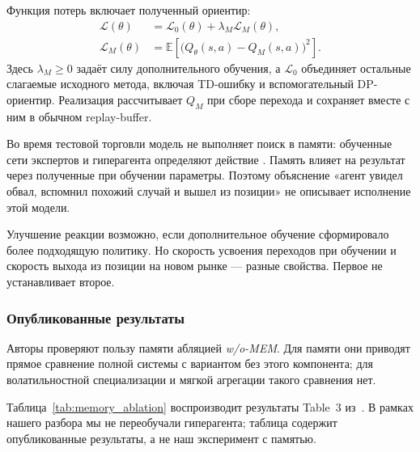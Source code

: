 \documentclass[9pt,a4paper,twocolumn]{extarticle}
\begin{document}
Функция потерь включает полученный ориентир:
\begin{equation}
  \begin{aligned}
    \mathcal L(\theta)
    &=
    \mathcal L_0(\theta)
    +\lambda_M\mathcal L_M(\theta),\\
    \mathcal L_M(\theta)
    &=
    \mathbb E\left[
      \bigl(Q_\theta(s,a)-Q_M(s,a)\bigr)^2
    \right].
  \end{aligned}
  \label{eq:memory_loss}
\end{equation}
Здесь $\lambda_M\geq0$ задаёт силу дополнительного обучения, а $\mathcal L_0$ объединяет
остальные слагаемые исходного метода, включая TD-ошибку и вспомогательный DP-ориентир.
Реализация рассчитывает $Q_M$ при сборе перехода и сохраняет вместе с ним в обычном
replay-buffer.

Во время тестовой торговли модель не выполняет поиск в памяти: обученные сети экспертов и
гиперагента определяют действие \cite{macrohftcode}. Память влияет на результат через полученные
при обучении параметры. Поэтому объяснение «агент увидел обвал, вспомнил похожий случай и вышел
из позиции» не описывает исполнение этой модели.

Улучшение реакции возможно, если дополнительное обучение сформировало более подходящую политику.
Но скорость усвоения переходов при обучении и скорость выхода из позиции
на новом рынке --- разные свойства. Первое не устанавливает второе.

\subsubsection{Опубликованные результаты}

Авторы проверяют пользу памяти абляцией \emph{w/o-MEM}. Для памяти они приводят прямое сравнение
полной системы с вариантом без этого компонента; для волатильностной специализации и мягкой
агрегации такого сравнения нет.

Таблица~\ref{tab:memory_ablation} воспроизводит результаты Table~3 из~\cite{zong2024macrohft}. В
рамках нашего разбора мы не переобучали гиперагента; таблица содержит опубликованные результаты,
а не наш эксперимент с памятью.
\end{document}
